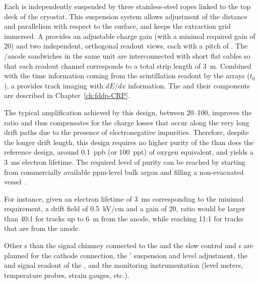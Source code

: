 Each  is independently suspended by three stainless-steel ropes linked to the top deck of the cryostat. This suspension system allows adjustment of the  distance and parallelism with respect to the \lar surface, and keeps the extraction grid immersed. A  provides an adjustable charge gain (with a minimal required gain of \num{20}) and two independent, orthogonal readout views, each with a pitch of \dpstrippitch.  The /anode sandwiches  in the same  unit are interconnected with short flat cables so that each readout channel corresponds to a total strip length of \SI{3}{m}. Combined with the time information coming from the \lar scintillation readout by the  arrays ($t_0$), a  provides \threed track imaging with $dE/dx$ information.  The  and their components are described in Chapter~\ref{ch:fddp-CRP}.

The typical amplification achieved by this design, between \numrange{20}{100}, improves the  ratio and thus  compensates for the charge losses that occur along the very long drift paths due to the presence of  electronegative impurities. Therefore, despite the longer drift length, this design requires no higher 
purity of the \lar than does the reference design, around \SI{0.1}{ppb} (or \SI{100}{ppt}) of oxygen equivalent, and yields a \SI{3}{ms} electron lifetime. The required level of purity can be reached by starting from  commercially available ppm-level bulk argon and filling a non-evacuated vessel~\cite{WA105-TDR}.


For instance, given an electron lifetime of \SI{3}{ms} corresponding to the minimal requirement,  a drift field of \SI{0.5}{kV/cm} and a  gain of \num{20},  ratio would be larger than  \num{40}:\num{1} for tracks up to \SI{6}{m} from the anode, while reaching  \num{11}:\num{1} for   tracks that are \dpmaxdrift from the anode.


Other \fdth{}s than the signal chimney connected to the  and the  slow control and \fdth{}s are planned for the cathode  connection, the ' suspension and level adjustment, the  and signal readout of the , and the monitoring instrumentation (level meters, temperature probes, strain gauges, etc.).

